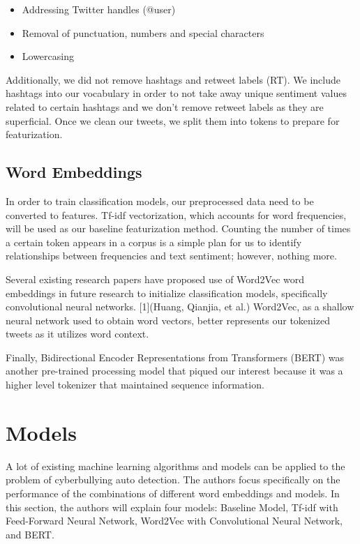 \documentclass[conference]{IEEEtran}
\begin{document}
\begin{itemize}
\item Addressing Twitter handles (@user)

\item Removal of punctuation, numbers and special characters

\item Lowercasing
\end{itemize}

Additionally, we did not remove hashtags and retweet labels (RT). We include hashtags into our vocabulary in order to not take away unique sentiment values related to certain hashtags and we don't remove retweet labels as they are superficial. Once we clean our tweets, we split them into tokens to prepare for featurization.


\subsection{Word Embeddings}

In order to train classification models, our preprocessed data need to be converted to features. Tf-idf vectorization, which accounts for word frequencies, will be used as our baseline featurization method. Counting the number of times a certain token appears in a corpus is a simple plan for us to identify relationships between frequencies and text sentiment; however, nothing more.

	Several existing research papers have proposed use of Word2Vec word embeddings in future research to initialize classification models, specifically convolutional neural networks. [1](Huang, Qianjia, et al.) Word2Vec, as a shallow neural network used to obtain word vectors, better represents our tokenized tweets as it utilizes word context. 

	Finally, Bidirectional Encoder Representations from Transformers (BERT) was another pre-trained processing model that piqued our interest because it was a higher level tokenizer that maintained sequence information.



\section{Models}
A lot of existing machine learning algorithms and models can be applied to the problem of cyberbullying auto detection. The authors focus specifically on the performance of the combinations of different word embeddings and models. In this section, the authors will explain four models: Baseline Model, Tf-idf with Feed-Forward Neural Network, Word2Vec with Convolutional Neural Network, and BERT.
\end{document}
